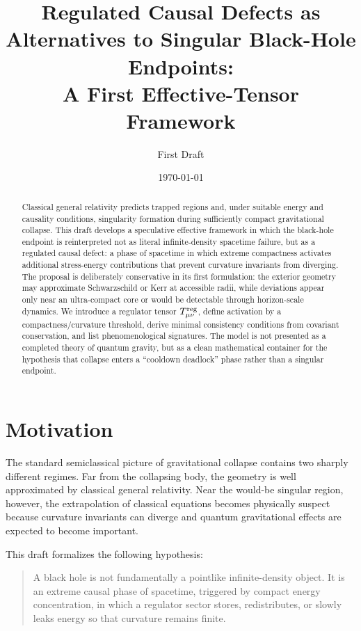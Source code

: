 \documentclass[11pt]{article}
\title{Regulated Causal Defects as Alternatives to Singular Black-Hole Endpoints:\\A First Effective-Tensor Framework}
\author{First Draft}
\date{\today}
\theoremstyle{remark}
\begin{document}
\maketitle

\begin{abstract}
Classical general relativity predicts trapped regions and, under suitable energy and causality conditions, singularity formation during sufficiently compact gravitational collapse. This draft develops a speculative effective framework in which the black-hole endpoint is reinterpreted not as literal infinite-density spacetime failure, but as a regulated causal defect: a phase of spacetime in which extreme compactness activates additional stress-energy contributions that prevent curvature invariants from diverging. The proposal is deliberately conservative in its first formulation: the exterior geometry may approximate Schwarzschild or Kerr at accessible radii, while deviations appear only near an ultra-compact core or would be detectable through horizon-scale dynamics. We introduce a regulator tensor $T^{\rm reg}_{\mu\nu}$, define activation by a compactness/curvature threshold, derive minimal consistency conditions from covariant conservation, and list phenomenological signatures. The model is not presented as a completed theory of quantum gravity, but as a clean mathematical container for the hypothesis that collapse enters a ``cooldown deadlock'' phase rather than a singular endpoint.
\end{abstract}

\section{Motivation}
The standard semiclassical picture of gravitational collapse contains two sharply different regimes. Far from the collapsing body, the geometry is well approximated by classical general relativity. Near the would-be singular region, however, the extrapolation of classical equations becomes physically suspect because curvature invariants can diverge and quantum gravitational effects are expected to become important.

This draft formalizes the following hypothesis:
\begin{quote}
A black hole is not fundamentally a pointlike infinite-density object. It is an extreme causal phase of spacetime, triggered by compact energy concentration, in which a regulator sector stores, redistributes, or slowly leaks energy so that curvature remains finite.
\end{quote}
\end{document}
